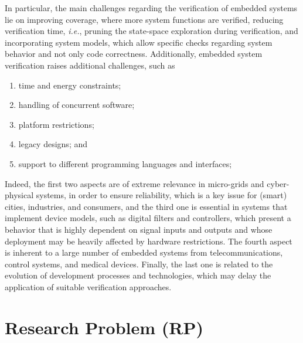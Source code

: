 \documentclass{acm_sen_article}
\begin{document}
In particular, the main challenges regarding the verification of embedded systems lie on improving coverage, where more system functions are verified, reducing verification time, {\it i.e.}, pruning the state-space exploration during verification, and incorporating system models, which allow specific checks regarding system behavior and not only code correctness. Additionally, embedded system verification raises additional challenges, such as 
%
\begin{enumerate}
	\item time and energy constraints;
	\item handling of concurrent software;
	\item platform restrictions;
	\item legacy designs; and %
	\item support to different programming languages and interfaces;
\end{enumerate}

Indeed, the first two aspects are of extreme relevance in micro-grids and cyber-physical systems, in order to ensure reliability, which is a key issue for (smart) cities, industries, and consumers, and the third one is essential in systems that implement device models, such as digital filters and controllers, which present a behavior that is highly dependent on signal inputs and outputs and whose deployment may be heavily affected by hardware restrictions. The fourth aspect is inherent to a large number of embedded systems from  telecommunications, control systems, and medical devices. Finally, the last one is related to the evolution of development processes and technologies, which may delay the application of suitable verification approaches.


\section{Research Problem (RP)}
\label{Research-Problem}
\end{document}
